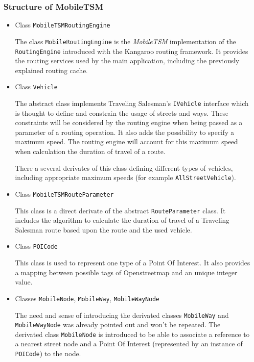 \subsubsection{Structure of MobileTSM}
\label{subsubsec:routing_mobiletsm_structure}

\begin{itemize}
		
	\item Class \texttt{MobileTSMRoutingEngine}
	
		The class \texttt{MobileRoutingEngine} is the \emph{MobileTSM} implementation of the \texttt{RoutingEngine} introduced with the Kangaroo routing framework. It provides the routing services used by the main application, including the previously explained routing cache.
		
	\item Class \texttt{Vehicle}
	
		The abstract class  implements Traveling Salesman's \texttt{IVehicle} interface which is thought to define and constrain the usage of streets and ways. These constraints will be considered by the routing engine when being passed as a parameter of a routing operation. It also adds the possibility to specify a maximum speed. The routing engine will account for this maximum speed when calculation the duration of travel of a route.\newline
		
		There a several derivates of this class defining different types of vehicles, including appropriate maximum speeds (for example \texttt{AllStreetVehicle}).
	
	\item Class \texttt{MobileTSMRouteParameter}
	
		This class is a direct derivate of the abstract \texttt{RouteParameter} class. It includes the algorithm to calculate the duration of travel of a Traveling Salesman route based upon the route and the used vehicle.

	\item Class \texttt{POICode}

		This class is used to represent one type of a Point Of Interest. It also provides a mapping between possible tags of Openstreetmap and an unique integer value.
	
	\item Classes \texttt{MobileNode}, \texttt{MobileWay}, \texttt{MobileWayNode} 
	
		The need and sense of introducing the derivated classes \texttt{MobileWay} and \texttt{MobileWayNode} was already pointed out and won't be repeated. The derivated class \texttt{MobileNode} is introduced to be able to associate a reference to a nearest street node and a Point Of Interest (represented by an instance of \texttt{POICode}) to the node.


\end{itemize}
